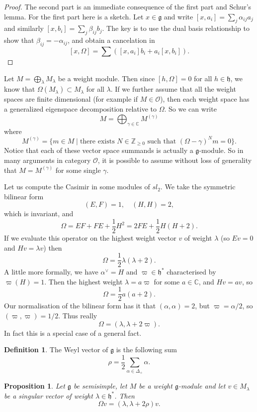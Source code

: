 \documentclass[12pt]{article}
\theoremstyle{plain}
\newtheorem{prop}[thm]{Proposition}
\theoremstyle{definition}
\newtheorem{defn}{Definition}[section]
\numberwithin{equation}{section}
\newcommand{\al}{\alpha}
\newcommand{\la}{\lambda}
\newcommand{\Om}{\Omega}
\newcommand{\D}{\Delta}
\newcommand{\C}{\mathbb{C}}
\newcommand{\Z}{\mathbb{Z}}
\newcommand{\g}{\mathfrak{g}}
\newcommand{\h}{\mathfrak{h}}
\newcommand{\OO}{\mathcal{O}}
\begin{document}
\begin{proof}
The second part is an immediate consequence of the first part and Schur's lemma. For the first part here is a sketch. Let $x \in \g$ and write $[x, a_i] = \sum_j \alpha_{ij} a_j$ and similarly $[x, b_i] = \sum_j \beta_{ij} b_j$. The key is to use the dual basis relationship to show that $\beta_{ij} = -\al_{ij}$, and obtain a cancelation in
\[
[x, \Om] = \sum([x, a_i]b_i + a_i [x, b_i]).
\]
\end{proof}
Let $M = \bigoplus_{\la} M_\la$ be a weight module. Then since $[h, \Om] = 0$ for all $h \in \h$, we know that $\Om(M_\la) \subset M_{\la}$ for all $\la$. If we further assume that all the weight spaces are finite dimensional (for example if $M \in \OO$), then each weight space has a generalized eigenspace decomposition relative to $\Om$. So we can write
\[
M = \bigoplus_{\gamma \in \C} M^{(\gamma)}
\]
where
\[
M^{(\gamma)} = \{m \in M \mid \text{there exists $N \in \Z_{\geq 0}$ such that $(\Om-\gamma)^N m = 0$}\}.
\]
Notice that each of these vector space summands is actually a $\g$-module. So in many arguments in category $\OO$, it is possible to assume without loss of generality that $M = M^{(\gamma)}$ for some single $\gamma$.



Let us compute the Casimir in some modules of $sl_2$. We take the symmetric bilinear form
\[
(E, F) = 1, \quad (H, H) = 2,
\]
which is invariant, and
\[
\Omega = EF + FE + \frac{1}{2} H^2 = 2FE + \frac{1}{2}H(H+2).
\]
If we evaluate this operator on the highest weight vector $v$ of weight $\lambda$ (so $Ev = 0$ and $Hv = \lambda v$) then
\[
\Omega = \frac{1}{2}\lambda(\lambda+2).
\]
A little more formally, we have $\al^\vee = H$ and $\varpi \in \h^*$ characterised by $\varpi(H) = 1$. Then the highest weight $\la = a \varpi$ for some $a \in \C$, and $H v = a v$, so
\[
\Omega = \frac{1}{2}a(a+2).
\]
Our normalisation of the bilinear form has it that $(\al, \al) = 2$, but $\varpi = \al / 2$, so $(\varpi, \varpi) = 1/2$. Thus really
\[
\Omega = (\la, \la + 2\varpi).
\]
In fact this is a special case of a general fact.
\begin{defn}
The Weyl vector of $\g$ is the following sum
\[
\rho = \frac{1}{2} \sum_{\al \in \D_+} \al.
\]
\end{defn}
\begin{prop}
Let $\g$ be semisimple, let $M$ be a weight $\g$-module and let $v \in M_\la$ be a singular vector of weight $\la \in \h^*$. Then
\[
\Om v = (\la, \la+2\rho) v.
\]
\end{prop}
\end{document}
